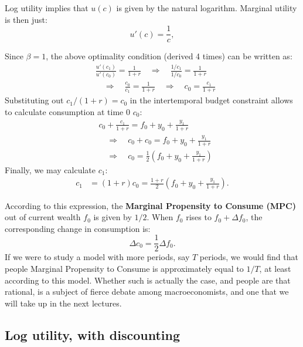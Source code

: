 \documentclass[]{book}
\theoremstyle{definition}
\theoremstyle{definition}
\theoremstyle{definition}
\theoremstyle{remark}
\begin{document}
Log utility implies that \(u(c)\) is given by the natural logarithm.
Marginal utility is then just: \[u'(c)=\frac{1}{c},\]

Since \(\beta=1\), the above optimality condition (derived 4 times) can
be written as: \[
\begin{aligned}
& \frac{u'(c_{1})}{u'(c_{0})}=\frac{1}{1+r} \quad \Rightarrow \quad \frac{1/c_1}{1/c_0}=\frac{1}{1+r} \\
& \quad \Rightarrow \quad \frac{c_0}{c_1}=\frac{1}{1+r} \quad \Rightarrow \quad c_{0}=\frac{c_{1}}{1+r}
\end{aligned}
\] Substituting out \(c_{1}/(1+r)=c_0\) in the intertemporal budget
constraint allows to calculate consumption at time \(0\) \(c_0\): \[
\begin{aligned}
&c_{0}+\frac{c_{1}}{1+r}=f_{0}+y_{0}+\frac{y_{1}}{1+r}\\
&\quad \Rightarrow \quad c_{0}+c_0=f_{0}+y_{0}+\frac{y_{1}}{1+r}\\
&\quad \Rightarrow \quad c_{0}=\frac{1}{2}\left(f_{0}+y_{0}+\frac{y_{1}}{1+r}\right)
\end{aligned}
\] Finally, we may calculate \(c_1\): \[
\begin{aligned}
c_{1}&=(1+r)c_0=\frac{1+r}{2}\left(f_{0}+y_{0}+\frac{y_{1}}{1+r}\right).
\end{aligned}
\]

According to this expression, the \textbf{Marginal Propensity to Consume
(MPC)} out of current wealth \(f_{0}\) is given by \(1/2\). When \(f_0\)
rises to \(f_0+\Delta f_0\), the corresponding change in consumption is:
\[\Delta c_0 = \frac{1}{2}\Delta f_0.\] If we were to study a model with
more periods, say \(T\) periods, we would find that people Marginal
Propensity to Consume is approximately equal to \(1/T\), at least
according to this model. Whether such is actually the case, and people
are that rational, is a subject of fierce debate among macroeconomists,
and one that we will take up in the next lectures.

\subsection{Log utility, with
discounting}\label{log-utility-with-discounting}
\end{document}
